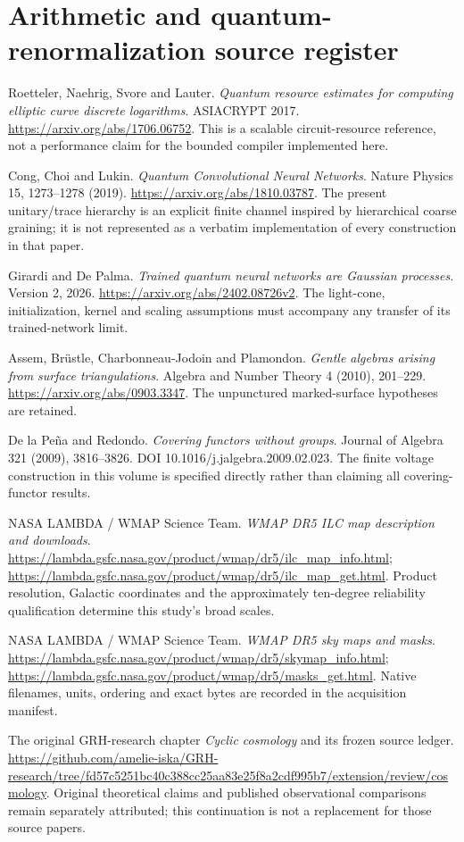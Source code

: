 \chapter{Arithmetic and quantum-renormalization source register}
\small\raggedright
\begin{description}[leftmargin=2.6em,labelwidth=2em]
\item[E1] Roetteler, Naehrig, Svore and Lauter. \emph{Quantum resource estimates for computing elliptic curve discrete logarithms}. ASIACRYPT 2017. \url{https://arxiv.org/abs/1706.06752}. This is a scalable circuit-resource reference, not a performance claim for the bounded compiler implemented here.
\item[Q1] Cong, Choi and Lukin. \emph{Quantum Convolutional Neural Networks}. Nature Physics 15, 1273--1278 (2019). \url{https://arxiv.org/abs/1810.03787}. The present unitary/trace hierarchy is an explicit finite channel inspired by hierarchical coarse graining; it is not represented as a verbatim implementation of every construction in that paper.
\item[Q2] Girardi and De Palma. \emph{Trained quantum neural networks are Gaussian processes}. Version 2, 2026. \url{https://arxiv.org/abs/2402.08726v2}. The light-cone, initialization, kernel and scaling assumptions must accompany any transfer of its trained-network limit.
\item[G1] Assem, Br\"ustle, Charbonneau-Jodoin and Plamondon. \emph{Gentle algebras arising from surface triangulations}. Algebra and Number Theory 4 (2010), 201--229. \url{https://arxiv.org/abs/0903.3347}. The unpunctured marked-surface hypotheses are retained.
\item[G2] De la Pe\~na and Redondo. \emph{Covering functors without groups}. Journal of Algebra 321 (2009), 3816--3826. DOI 10.1016/j.jalgebra.2009.02.023. The finite voltage construction in this volume is specified directly rather than claiming all covering-functor results.
\item[C1] NASA LAMBDA / WMAP Science Team. \emph{WMAP DR5 ILC map description and downloads}. \url{https://lambda.gsfc.nasa.gov/product/wmap/dr5/ilc_map_info.html}; \url{https://lambda.gsfc.nasa.gov/product/wmap/dr5/ilc_map_get.html}. Product resolution, Galactic coordinates and the approximately ten-degree reliability qualification determine this study's broad scales.
\item[C2] NASA LAMBDA / WMAP Science Team. \emph{WMAP DR5 sky maps and masks}. \url{https://lambda.gsfc.nasa.gov/product/wmap/dr5/skymap_info.html}; \url{https://lambda.gsfc.nasa.gov/product/wmap/dr5/masks_get.html}. Native filenames, units, ordering and exact bytes are recorded in the acquisition manifest.
\item[C3] The original GRH-research chapter \emph{Cyclic cosmology} and its frozen source ledger. \url{https://github.com/amelie-iska/GRH-research/tree/fd57c5251bc40c388cc25aa83e25f8a2cdf995b7/extension/review/cosmology}. Original theoretical claims and published observational comparisons remain separately attributed; this continuation is not a replacement for those source papers.
\end{description}
